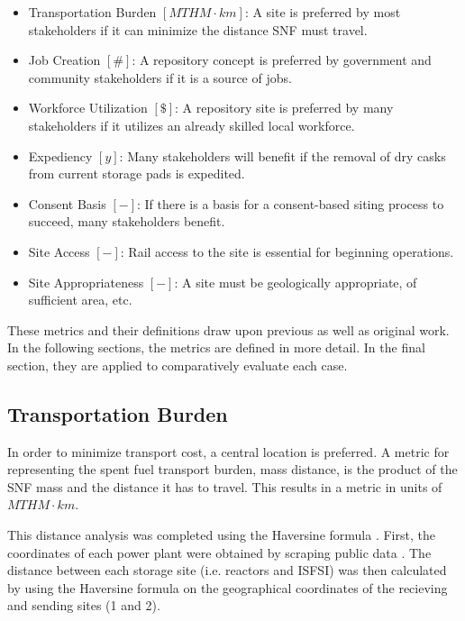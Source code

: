 \begin{itemize}
        \item Transportation Burden $[MTHM \cdot km]$: A site is preferred by 
                most stakeholders if it can minimize the distance \gls{SNF} 
                must travel.
        \item Job Creation $[\#]$: A repository concept is preferred by 
                government and community stakeholders if it is a source of 
                jobs. 
        \item Workforce Utilization $[\$]$: A repository site is preferred by 
                many stakeholders if it utilizes an already skilled local 
                workforce. 
        \item Expediency $[y]$: Many stakeholders will benefit if the removal 
                of dry casks from current storage pads is expedited.
        \item Consent Basis $[-]$: If there is a basis for a consent-based 
                siting process to succeed, many stakeholders benefit.
        \item Site Access $[-]$: Rail access to the site is essential for 
                beginning operations.
        \item Site Appropriateness $[-]$: A site must be geologically 
                appropriate, of sufficient area, etc.
\end{itemize}

These metrics and their definitions draw upon previous 
\cite{freeze_siting_2015,ISRG_book_2016} as well as original work.  In the 
following sections, the metrics are defined in more detail. In 
the final section, they are applied to comparatively evaluate each 
case.

\subsection{Transportation Burden}
 In order to minimize transport cost, a central location is preferred. A metric 
 for representing the spent fuel transport burden, mass distance, is the product 
 of the \gls{SNF} mass and the distance it has to travel. This results in a 
 metric in units of $MTHM\cdot km$. 
 
 This distance analysis was completed using the Haversine formula 
 \cite{shumaker_astronomical_1984}. First, the 
 coordinates of each power plant were obtained by scraping public data 
 \cite{wikipedia}.  The distance between each storage site (i.e. reactors and 
 \gls{ISFSI}) was then calculated by using the Haversine formula on the 
 geographical coordinates of the recieving and sending sites (1 and 2). 

